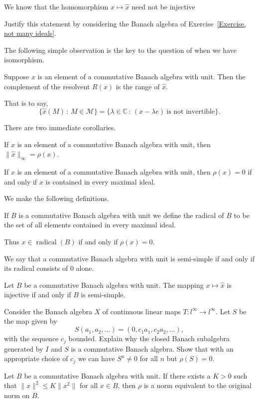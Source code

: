 We know that the homomorphism $x\mapsto \hat{x}$
need not be injective
\begin{exercise} Justify this statement by considering
the Banach algebra of Exercise~\ref{Exercise, not many ideals}.
\end{exercise}
The following simple observation is the key
to the question of when we have isomorphism.

\begin{lemma} Suppose $x$ is an element of a 
commutative Banach algebra with unit.
Then the complement of the resolvent $R(x)$ is the range of $\hat{x}$.
\end{lemma}
That is to say,
\[\{\hat{x}(M)\,:\,M\in{\mathcal M}\}
=\{\lambda\in{\mathbb C}\,:\,
(x-\lambda e)\ \text{is not invertible}\}.\]

There are two immediate corollaries.
\begin{lemma} If $x$ is an element of a 
commutative Banach algebra with unit,
then $\|\hat{x}\|_{\infty}=\rho(x)$.
\end{lemma}
\begin{lemma} If $x$ is an element of a 
commutative Banach algebra with unit,
then $\rho(x)=0$ if and only if $x$ is contained
in every maximal ideal.
\end{lemma}

We make the following definitions.
\begin{definition} If $B$ is a commutative
Banach algebra with unit we define the radical of $B$
to be the set of all elements contained in every
maximal ideal.
\end{definition}
Thus $x\in\operatorname{radical}(B)$ if and only
if $\rho(x)=0$.
\begin{definition} We say that a commutative
Banach algebra with unit is semi-simple if
and only if its radical consists of $0$ alone.
\end{definition}
\begin{theorem} Let $B$ be a commutative Banach algebra with unit.
The mapping $x\mapsto \hat{x}$
is injective if and only if $B$ is semi-simple.
\end{theorem}
\begin{exercise} Consider the Banach algebra $X$ of continuous
linear maps $T:l^{\infty}\rightarrow l^{\infty}$.
Let $S$ be the map given by
\[S(a_{1},a_{2},\dots)=(0,c_{1}a_{1},c_{2}a_{2},\dots),\]
with the sequence $c_{j}$ bounded.
Explain why the closed Banach subalgebra generated by
$I$ and $S$ is a commutative Banach algebra. Show that
with an appropriate choice of $c_{j}$ we can have $S^{n}\neq 0$
for all $n$ but $\rho(S)=0$.
\end{exercise}
\begin{theorem} Let $B$ be a commutative Banach algebra with unit.
If there exists a $K>0$ such that $\|x\|^{2}\leq K\|x^{2}\|$
for all $x\in B$, then $\rho$ is a norm equivalent to
the original norm on $B$.
\end{theorem}

